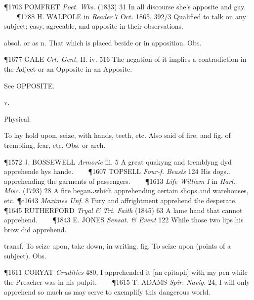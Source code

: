 \begin{description}[wide, labelwidth=!, labelindent=0pt]
\begin{myenumerate}
\P 1703 POMFRET  \textit{Poet. Wks.} (1833) 31 In all discourse she's apposite and gay.    
\P 1788 H. WALPOLE in \textit{Reader} 7 Oct. 1865, 392/3 Qualified to talk on any subject; easy, agreeable, and apposite in their observations.

 absol. or as n. That which is placed beside or in apposition. Obs.

\P 1677 GALE  \textit{Crt. Gent.} II. iv. 516 The negation of it implies a contradiction in the Adject or an Opposite in an Apposite.

 See OPPOSITE.
\end{myenumerate}


 v.

\noindent {}

\vspace{-0.3cm}

\begin{myenumerate}

 Physical.

 To lay hold upon, seize, with hands, teeth, etc. Also said of fire, and fig. of trembling, fear, etc. Obs. or arch.

\P 1572 J. BOSSEWELL  \textit{Armorie} iii. 5 A great quakyng and tremblyng dyd apprehende hys hande.    
\P 1607 TOPSELL  \textit{Four-f. Beasts} 124 His dogs‥apprehending the garments of passengers.    
\P 1613 \textit{Life  William I} in \textit{Harl. Misc.} (1793) 28 A fire began‥which apprehending certain shops and warehouses, etc.
\P c1643 \textit{Maximes  Unf.} 8 Fury and affrightment apprehend the desperate.    
\P 1645 RUTHERFORD  \textit{Tryal \& Tri. Faith} (1845) 63 A lame hand that cannot apprehend.    
\P 1843 E. JONES  \textit{Sensat. \& Event} 122 While those two lips his brow did apprehend.

 transf. To seize upon, take down, in writing. fig. To seize upon (points of a subject). Obs.

\P 1611 CORYAT  \textit{Crudities} 480, I apprehended it [an epitaph] with my pen while the Preacher was in his pulpit.    
\P 1615 T. ADAMS  \textit{Spir. Navig.} 24, I will only apprehend so much as may serve to exemplify this dangerous world.


\end{myenumerate}
\end{description}
